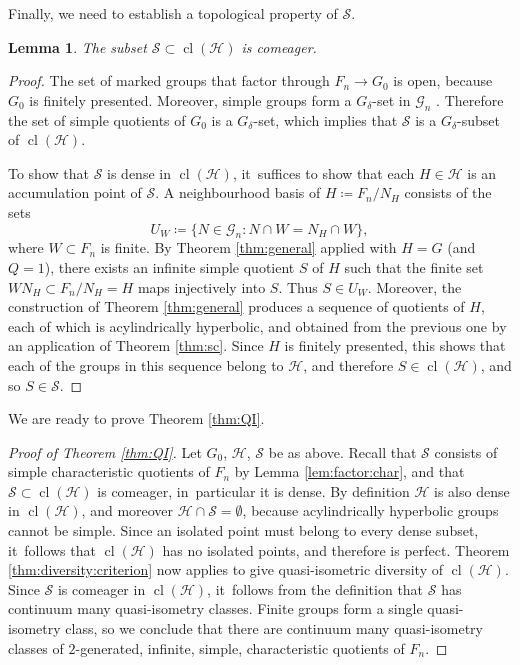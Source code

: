 \documentclass[JEP,XML,SOM,Unicode]{cedram}
\newtheorem{lemma}[theorem]{Lemma}
\theoremstyle{definition}
\newcommand{\cl}{\operatorname{cl}}
\newcommand{\Gn}{\mathcal{G}_n}
\begin{document}
Finally, we need to establish a topological property of $\mathcal{S}$.

\begin{lemma}
\label{lem:comeager}
The subset $\mathcal{S} \subset \cl(\mathcal{H})$ is comeager.
\end{lemma}

\begin{proof}
The set of marked groups that factor through $F_n \to G_0$ is open, because $G_0$ is finitely presented. Moreover, simple groups form a $G_\delta$-set in $\Gn$ \cite[Cor.\,4.5]{diversity}. Therefore the set of simple quotients of $G_0$ is a $G_\delta$-set, which implies that $\mathcal{S}$ is a $G_\delta$-subset of $\cl(\mathcal{H})$.

To show that $\mathcal{S}$ is dense in $\cl(\mathcal{H})$, it~suffices to show that each $H \in \mathcal{H}$ is an accumulation point of $\mathcal{S}$. A neighbourhood basis of $H \coloneqq F_n / N_H$ consists of the sets
\begin{equation*}
U_W \coloneqq \{ N \in \Gn : N \cap W = N_H \cap W \},
\end{equation*}
where $W \subset F_n$ is finite. By Theorem \ref{thm:general} applied with $H = G$ (and $Q = 1$), there exists an infinite simple quotient $S$ of $H$ such that the finite set $W N_H \subset F_n / N_H = H$ maps injectively into $S$. Thus $S \in U_W$. Moreover, the construction of Theorem \ref{thm:general} produces a sequence of quotients of $H$, each of which is acylindrically hyperbolic, and obtained from the previous one by an application of Theorem \ref{thm:sc}. Since $H$ is finitely presented, this shows that each of the groups in this sequence belong to $\mathcal{H}$, and therefore $S \in \cl(\mathcal{H})$, and so $S \in \mathcal{S}$.
\end{proof}

We are ready to prove Theorem \ref{thm:QI}.

\begin{proof}[Proof of Theorem \ref{thm:QI}]
Let $G_0$, $\mathcal{H}$, $\mathcal{S}$ be as above. Recall that $\mathcal{S}$ consists of simple characteristic quotients of $F_n$ by Lemma \ref{lem:factor:char}, and that $\mathcal{S} \subset \cl(\mathcal{H})$ is comeager, in~particular it is dense.
By definition $\mathcal{H}$ is also dense in $\cl(\mathcal{H})$, and moreover $\mathcal{H} \cap \mathcal{S} = \emptyset$, because acylindrically hyperbolic groups cannot be simple. Since an isolated point must belong to every dense subset, it~follows that $\cl(\mathcal{H})$ has no isolated points, and therefore is perfect.
Theorem \ref{thm:diversity:criterion} now applies to give quasi-isometric diversity of $\cl(\mathcal{H})$. Since $\mathcal{S}$ is comeager in $\cl(\mathcal{H})$, it~follows from the definition that $\mathcal{S}$ has continuum many quasi-isometry classes. Finite groups form a single quasi-isometry class, so we conclude that there are continuum many quasi-isometry classes of $2$-generated, infinite, simple, characteristic quotients of $F_n$.
\end{proof}
\end{document}
